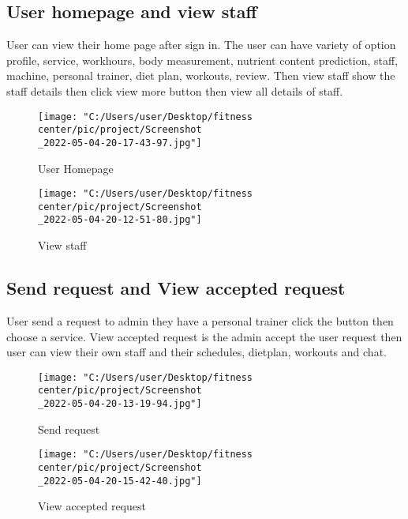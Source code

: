 \documentclass[a4paper,12pt,toc=flat]{report}
\begin{document}
{{ \subsection {User homepage  and view staff}
 User can view their home page after sign in. The user can have variety of option profile, service, workhours, body measurement, nutrient content prediction, staff, machine, personal trainer, diet plan, workouts, review. Then view staff show the staff details then click view more button then view all details of staff.
 \begin{figure}[!ht]
 	\begin{minipage}{0.45\linewidth}
 		\texttt{[image: "C:/Users/user/Desktop/fitness center/pic/project/Screenshot\\\_2022-05-04-20-17-43-97.jpg"]}
 		\caption{User Homepage}
 	\end{minipage}
 	\hfill
 	\begin{minipage}{0.4\linewidth}
 		\texttt{[image: "C:/Users/user/Desktop/fitness center/pic/project/Screenshot\\\_2022-05-04-20-12-51-80.jpg"]}
 		\caption{View staff}
 	\end{minipage}
 \end{figure}
 \pagebreak
 \subsection {Send request and View accepted request  }
User send a request to admin they have a personal trainer click the button then choose a service. View accepted request is the admin accept the user request then user can view their own staff and their schedules, dietplan, workouts and chat.
 \begin{figure}[!ht]
 	\begin{minipage}{0.45\linewidth}
 		\texttt{[image: "C:/Users/user/Desktop/fitness center/pic/project/Screenshot\\\_2022-05-04-20-13-19-94.jpg"]}
 		\caption{Send request}
 	\end{minipage}
 	\hfill
 	\begin{minipage}{0.4\linewidth}
 		\texttt{[image: "C:/Users/user/Desktop/fitness center/pic/project/Screenshot\\\_2022-05-04-20-15-42-40.jpg"]}
 		\caption{View accepted request }
 	\end{minipage}
 \end{figure}
 
 \newpage
}}
\end{document}
